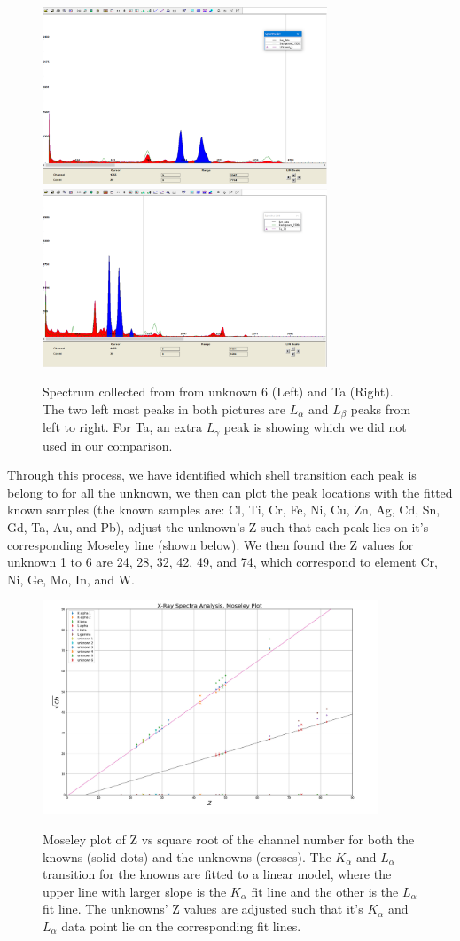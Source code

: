 \documentclass[12pt]{article}
\begin{document}
\begin{figure}[H]
\includegraphics[width=8.5cm]{U6}
\includegraphics[width=8.5cm]{Ta_73}
\label{Fig.3}
\caption{Spectrum collected from from unknown 6 (Left) and Ta (Right). The two left most peaks in both pictures are $L_{\alpha}$ and $L_{\beta}$ peaks from left to right. For Ta, an extra $L_{\gamma}$ peak is showing which we did not used in our comparison.}
\end{figure}
\smallskip

Through this process, we have identified which shell transition each peak is belong to for all the unknown, we then can plot the peak locations with the fitted known samples (the known samples are: Cl, Ti, Cr, Fe, Ni, Cu, Zn, Ag, Cd, Sn, Gd, Ta, Au, and Pb), adjust the unknown's Z such that each peak lies on it's corresponding Moseley line (shown below).
We then found the Z values for unknown 1 to 6 are 24, 28, 32, 42, 49, and 74, which correspond to element Cr, Ni, Ge, Mo, In, and W.


\begin{figure}
\includegraphics[width=10cm]{unknowns}
\label{Fig.4}
\caption{Moseley plot of Z vs square root of the channel number for both the knowns (solid dots) and the unknowns (crosses). The $K_\alpha$ and $L_\alpha$ transition for the knowns are fitted to a linear model, where the upper line with larger slope is the $K_\alpha$ fit line and the other is the $L_\alpha$ fit line. The unknowns' Z values are adjusted such that it's $K_\alpha$ and $L_\alpha$ data point lie on the corresponding fit lines.}
\end{figure}
\bigskip
\end{document}
